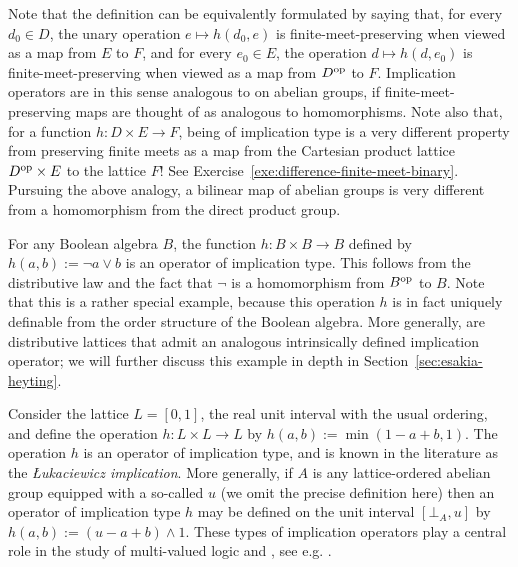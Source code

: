 Note that the definition can be equivalently formulated by saying that, for
every $d_0 \in D$, the unary operation $e \mapsto h(d_0, e)$ is
finite-meet-preserving when viewed as a map from $E$ to $F$, and for every $e_0
\in E$, the operation $d \mapsto h(d, e_0)$ is finite-meet-preserving when
viewed as a map from $D^{\mathrm{op}}$ to $F$. Implication operators are in this
sense analogous to  on abelian groups, if
finite-meet-preserving maps are thought of as analogous to homomorphisms. Note
also that, for a function $h \colon D \times E \to F$, being of implication type
is a very different property from preserving finite meets as a map from the
Cartesian product lattice $D^{\mathrm{op}} \times E$ to the lattice $F$! See
Exercise~\ref{exe:difference-finite-meet-binary}. Pursuing the above analogy, a
bilinear map of abelian groups is very different from a homomorphism from the
direct product group. 

\begin{example}\label{exa:BoolandHeyt} For any Boolean algebra $B$, the function
$h \colon B \times B \to B$ defined by $h(a,b) := \neg a \vee b$ is an operator
of implication type. This follows from the distributive law and the fact that
$\neg$ is a homomorphism from $B^{\mathrm{op}}$ to $B$. Note that this is a rather special
example, because this operation $h$ is in fact uniquely definable from the order
structure of the Boolean algebra. More generally,  are
distributive lattices that admit an analogous intrinsically defined implication
operator; we will further discuss this example in depth in
Section~\ref{sec:esakia-heyting}.  \end{example}

\begin{example}\label{exa:MV} Consider the lattice $L =
[0,1]$, the real unit interval with the usual ordering, and define the operation $h \colon L \times L \to L$ by $h(a,b) := \min(1-a+b,1)$. The operation $h$ is 
an operator of implication type, and is known in the literature as the
\emph{{\L}ukaciewicz implication}. More generally, if $A$ is any lattice-ordered
abelian group equipped with a so-called  $u$ (we omit the
precise definition here) then an operator of implication type $h$ may be defined
on the unit interval $[\bot_A, u]$ by $h(a,b) := (u - a + b) \wedge 1$. These
types of implication operators play a central role in the study of multi-valued
logic and , see e.g. \cite{CDM, Mun2011}.  \end{example}

